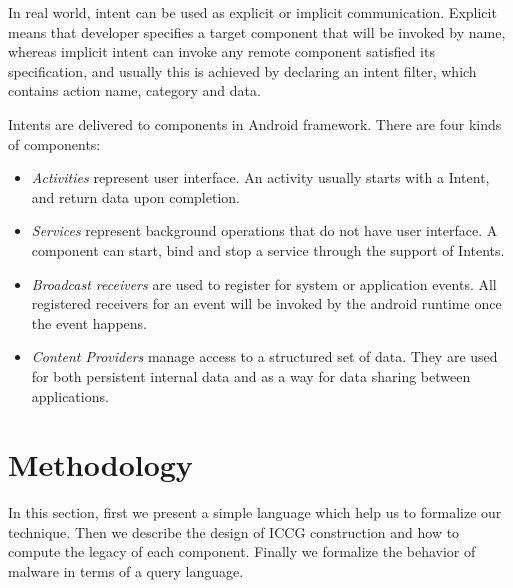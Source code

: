 \documentclass{sig-alternate}
\begin{document}
In real world, intent can be used as explicit or implicit communication. Explicit means that developer specifies a target component that will be invoked by name, whereas  implicit intent can invoke any remote component satisfied its specification, and usually this is achieved by declaring an intent filter, which contains action name, category and data. 

Intents are delivered to components in Android framework. There are four kinds of components:
\begin{itemize}
  \item \emph{Activities} represent user interface. An activity usually starts with a Intent, and return data upon completion. 
  \item \emph{Services} represent background operations that do not have user interface. A component can start, bind and stop a service through the support of Intents.
  \item \emph{Broadcast receivers} are used to register for system or application events. All registered receivers for an event will be invoked by the android runtime once the event happens.
  \item \emph{Content Providers} manage access to a structured set of data. They are used for both persistent internal data and as a way for data sharing between applications.
\end{itemize}

\section{Methodology}
In this section, first we present a simple language which help us to formalize our technique. Then we describe the design of ICCG construction and how to compute the legacy of each component. Finally we formalize the behavior of malware in terms of a query language.
\end{document}
